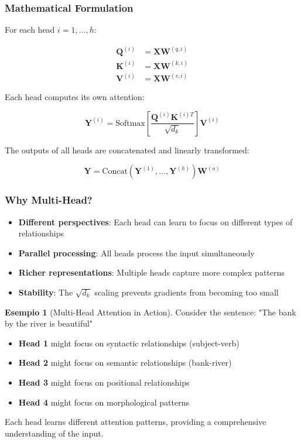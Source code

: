 \documentclass[11pt,a4paper]{article}
\theoremstyle{definition}
\newtheorem{example}{Esempio}[section]
\theoremstyle{plain}
\theoremstyle{remark}
\begin{document}
\subsubsection{Mathematical Formulation}

For each head $i = 1, \ldots, h$:

\begin{align*}
\mathbf{Q}^{(i)} &= \mathbf{X}\mathbf{W}^{(q,i)} \\
\mathbf{K}^{(i)} &= \mathbf{X}\mathbf{W}^{(k,i)} \\
\mathbf{V}^{(i)} &= \mathbf{X}\mathbf{W}^{(v,i)}
\end{align*}

Each head computes its own attention:

\[
\mathbf{Y}^{(i)} = \text{Softmax}\left[\frac{\mathbf{Q}^{(i)}\mathbf{K}^{(i)T}}{\sqrt{d_k}}\right]\mathbf{V}^{(i)}
\]

The outputs of all heads are concatenated and linearly transformed:

\[
\mathbf{Y} = \text{Concat}(\mathbf{Y}^{(1)}, \ldots, \mathbf{Y}^{(h)})\mathbf{W}^{(o)}
\]

\subsubsection{Why Multi-Head?}

\begin{itemize}
    \item \textbf{Different perspectives}: Each head can learn to focus on different types of relationships
    \item \textbf{Parallel processing}: All heads process the input simultaneously
    \item \textbf{Richer representations}: Multiple heads capture more complex patterns
    \item \textbf{Stability}: The $\sqrt{d_k}$ scaling prevents gradients from becoming too small
\end{itemize}

\begin{example}[Multi-Head Attention in Action]
Consider the sentence: "The bank by the river is beautiful"

\begin{itemize}
    \item \textbf{Head 1} might focus on syntactic relationships (subject-verb)
    \item \textbf{Head 2} might focus on semantic relationships (bank-river)
    \item \textbf{Head 3} might focus on positional relationships
    \item \textbf{Head 4} might focus on morphological patterns
\end{itemize}

Each head learns different attention patterns, providing a comprehensive understanding of the input.
\end{example}
\end{document}
